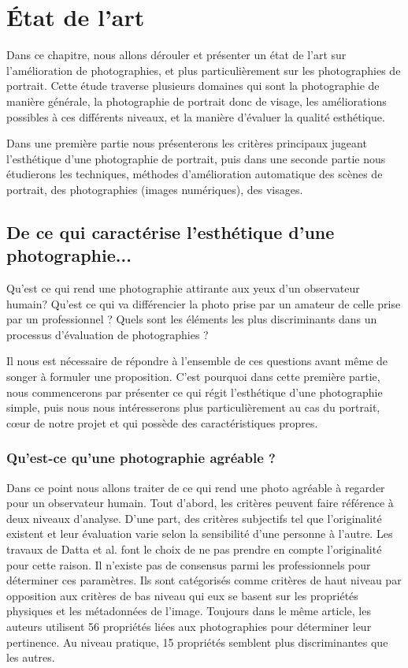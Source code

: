 \documentclass[11pt, french]{report-rd-info}
\begin{document}
\chapter{\'Etat de l'art}
\label{chap:EtatArt}
Dans ce chapitre, nous allons dérouler et présenter un état de l’art sur l’amélioration de photographies, et plus particulièrement sur les photographies de portrait. Cette étude traverse plusieurs domaines qui sont la photographie de manière générale, la photographie de portrait donc de visage, les améliorations possibles à ces différents niveaux, et la manière d’évaluer la qualité esthétique.

Dans une première partie nous présenterons les critères principaux jugeant l’esthétique d’une photographie de portrait, puis dans une seconde partie nous étudierons les techniques, méthodes d’amélioration automatique des scènes de portrait, des photographies (images numériques), des visages.
\section{De ce qui caractérise l’esthétique d’une photographie...}
Qu’est ce qui rend une photographie attirante aux yeux d’un observateur humain? Qu’est ce qui va différencier la photo prise par un amateur de celle prise par un professionnel ? Quels sont les éléments les plus discriminants dans un processus d'évaluation de photographies ?

Il nous est nécessaire de répondre à l’ensemble de ces questions avant même de songer à formuler une proposition. C’est pourquoi dans cette première partie, nous commencerons par présenter ce qui régit l'esthétique d’une photographie simple, puis nous nous intéresserons plus particulièrement au cas du portrait, cœur de notre projet et qui possède des caractéristiques propres.
\subsection{Qu’est-ce qu’une photographie agréable ?}
Dans ce point nous allons traiter de ce qui rend une photo agréable à regarder pour un observateur humain. Tout d’abord, les critères peuvent faire référence à deux niveaux d'analyse.
\label{originalite}
D’une part, des critères subjectifs tel que l’originalité existent et  leur évaluation varie selon la sensibilité d’une personne à l’autre. Les travaux de Datta et al. \cite{Datta} font le choix de ne pas prendre en compte l'originalité pour cette raison.  Il n’existe pas de consensus parmi les professionnels pour déterminer ces paramètres. Ils sont catégorisés comme critères de haut niveau par opposition aux critères de bas niveau qui eux se basent sur les propriétés physiques et les métadonnées de l’image. Toujours dans le même article, les auteurs utilisent 56 propriétés liées aux photographies pour déterminer leur pertinence. Au niveau pratique, 15 propriétés semblent plus discriminantes que les autres.
\end{document}
